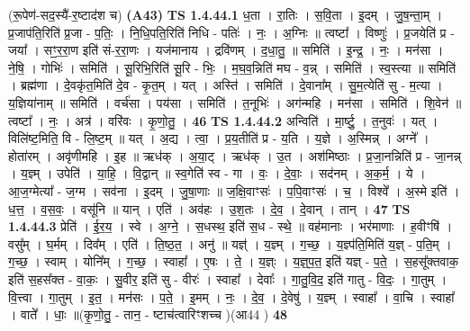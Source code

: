 \documentclass[17pt]{extarticle}
\begin{document}
                  \newline
                       (रू॒पेण॑-सद॒स्यै॑-र॒ष्टाद॑श च)  \textbf{(A43)} \newline \newline
                                \textbf{ TS 1.4.44.1} \newline
                  ध॒ता । रा॒तिः । स॒वि॒ता । इ॒दम् । जु॒ष॒न्ता॒म् । प्र॒जाप॑ति॒रिति॑ प्र॒जा - प॒तिः॒ । नि॒धि॒पति॒रिति॑ निधि - पतिः॑ । नः॒ । अ॒ग्निः ॥ त्वष्टा᳚ । विष्णुः॑ । प्र॒जयेति॑ प्र - जया᳚ । सꣳ॒॒र॒रा॒ण इति॑ सं-र॒रा॒णः । यज॑मानाय । द्रवि॑णम् । द॒धा॒तु॒ ॥ समिति॑ । इ॒न्द्र॒ । नः॒ । मन॑सा । ने॒षि॒ । गोभिः॑ । समिति॑ । सू॒रिभि॒रिति॑ सू॒रि - भिः॒ । म॒घ॒व॒न्निति॑ मघ - व॒न्न् । समिति॑ । स्व॒स्त्या ॥ समिति॑ । ब्रह्म॑णा । दे॒वकृ॑त॒मिति॑ दे॒व - कृ॒त॒म् । यत् । अस्ति॑ । समिति॑ । दे॒वाना᳚म् । सु॒म॒त्येति॑ सु - म॒त्या । य॒ज्ञिया॑नाम् ॥ समिति॑ । वर्च॑सा । पय॑सा । समिति॑ । त॒नूभिः॑ । अग॑न्महि । मन॑सा । समिति॑ । शि॒वेन॑ ॥ त्वष्टा᳚ । नः॒ । अत्र॑ । वरि॑वः । कृ॒णो॒तु॒ । \textbf{  46} \newline
                  \newline
                                \textbf{ TS 1.4.44.2} \newline
                  अन्विति॑ । मा॒र्ष्टु॒ । त॒नुवः॑ । यत् । विलि॑ष्ट॒मिति॒ वि - लि॒ष्ट॒म् ॥ यत् । अ॒द्य । त्वा॒ । प्र॒य॒तीति॑ प्र - य॒ति । य॒ज्ञे । अ॒स्मिन्न् । अग्ने᳚ । होता॑रम् । अवृ॑णीमहि । इ॒ह ॥ ऋध॑क् । अ॒या॒ट् । ऋध॑क् । उ॒त । अश॑मिष्ठाः । प्र॒जा॒नन्निति॑ प्र - जा॒नन्न् । य॒ज्ञ्म् । उपेति॑ । या॒हि॒ । वि॒द्वान् ॥ स्व॒गेति॑ स्व - गा । वः॒ । दे॒वाः॒ । सद॑नम् । अ॒क॒र्म॒ । ये । आ॒ज॒ग्मेत्या᳚ - ज॒ग्म । सव॑ना । इ॒दम् । जु॒षा॒णाः ॥ ज॒क्षि॒वाꣳसः॑ । प॒पि॒वाꣳसः॑ । च॒ । विश्वे᳚ । अ॒स्मे इति॑ । ध॒त्त॒ । व॒स॒वः॒ । वसू॑नि ॥ यान् । एति॑ । अव॑हः । उ॒श॒तः । दे॒व॒ । दे॒वान् । तान् । \textbf{  47} \newline
                  \newline
                                \textbf{ TS 1.4.44.3} \newline
                  प्रेति॑ । ई॒र॒य॒ । स्वे । अ॒ग्ने॒ । स॒धस्थ॒ इति॑ स॒ध - स्थे॒ ॥ वह॑मानाः । भर॑माणाः । ह॒वीꣳषि॑ । वसु᳚म् । घ॒र्मम् । दिव᳚म् । एति॑ । ति॒ष्ठ॒त॒ । अनु॑ ॥ यज्ञ्॑ । य॒ज्ञ्म् । ग॒च्छ॒ । य॒ज्ञ्प॑ति॒मिति॑ य॒ज्ञ् - प॒ति॒म् । ग॒च्छ॒ । स्वाम् । योनि᳚म् । ग॒च्छ॒ । स्वाहा᳚ । ए॒षः । ते॒ । य॒ज्ञ्ः । य॒ज्ञ्॒प॒त॒ इति॑ यज्ञ् - प॒ते॒ । स॒हसू᳚क्तवाक॒ इति॑ स॒हस᳚क्त - वा॒कः॒ । सु॒वीर॒ इति॑ सु - वीरः॑ । स्वाहा᳚ । देवाः᳚ । गा॒तु॒वि॒द॒ इति॑ गातु - वि॒दः॒ । गा॒तुम् । वि॒त्त्वा । गा॒तुम् । इ॒त॒ । मन॑सः । प॒ते॒ । इ॒मम् । नः॒ । दे॒व॒ । दे॒वेषु॑ । य॒ज्ञ्म् । स्वाहा᳚ । वा॒चि । स्वाहा᳚ । वाते᳚ । धाः॒ ॥(कृ॒णो॒तु॒ - तान॒ - ष्टाच॑त्वारिꣳशच्च )(आ44 ) \textbf{  48} \newline
\end{document}
